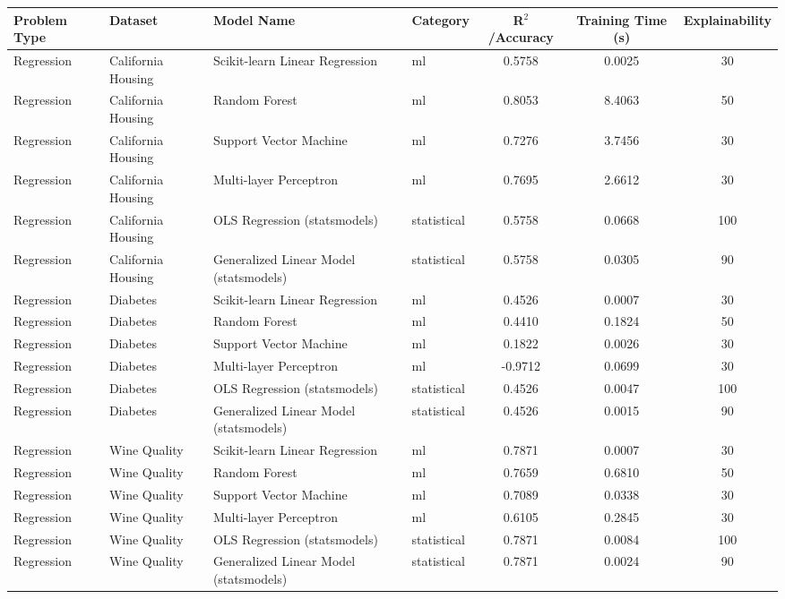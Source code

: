\documentclass[11pt,a4paper]{article}
\begin{document}
\begin{table}[h!]
\centering
\tiny
\begin{tabular}{llllccc}
\toprule
Problem Type & Dataset & Model Name & Category & R$^2$/Accuracy & Training Time (s) & Explainability \\
\midrule
Regression & California Housing & Scikit-learn Linear Regression & ml & 0.5758 & 0.0025 & 30 \\
Regression & California Housing & Random Forest & ml & 0.8053 & 8.4063 & 50 \\
Regression & California Housing & Support Vector Machine & ml & 0.7276 & 3.7456 & 30 \\
Regression & California Housing & Multi-layer Perceptron & ml & 0.7695 & 2.6612 & 30 \\
Regression & California Housing & OLS Regression (statsmodels) & statistical & 0.5758 & 0.0668 & 100 \\
Regression & California Housing & Generalized Linear Model (statsmodels) & statistical & 0.5758 & 0.0305 & 90 \\
Regression & Diabetes & Scikit-learn Linear Regression & ml & 0.4526 & 0.0007 & 30 \\
Regression & Diabetes & Random Forest & ml & 0.4410 & 0.1824 & 50 \\
Regression & Diabetes & Support Vector Machine & ml & 0.1822 & 0.0026 & 30 \\
Regression & Diabetes & Multi-layer Perceptron & ml & -0.9712 & 0.0699 & 30 \\
Regression & Diabetes & OLS Regression (statsmodels) & statistical & 0.4526 & 0.0047 & 100 \\
Regression & Diabetes & Generalized Linear Model (statsmodels) & statistical & 0.4526 & 0.0015 & 90 \\
Regression & Wine Quality & Scikit-learn Linear Regression & ml & 0.7871 & 0.0007 & 30 \\
Regression & Wine Quality & Random Forest & ml & 0.7659 & 0.6810 & 50 \\
Regression & Wine Quality & Support Vector Machine & ml & 0.7089 & 0.0338 & 30 \\
Regression & Wine Quality & Multi-layer Perceptron & ml & 0.6105 & 0.2845 & 30 \\
Regression & Wine Quality & OLS Regression (statsmodels) & statistical & 0.7871 & 0.0084 & 100 \\
Regression & Wine Quality & Generalized Linear Model (statsmodels) & statistical & 0.7871 & 0.0024 & 90 \\

\end{tabular}
\end{table}
\end{document}
